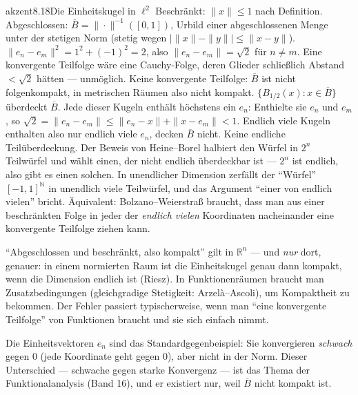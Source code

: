 \begin{loesungkarte}{akzent}{8.18}{Die Einheitskugel in $\ell^{2}$}
Beschränkt: $\|x\|\le1$ nach Definition. Abgeschlossen: $\overline B = \|\cdot\|^{-1}([0, 1])$, Urbild einer abgeschlossenen Menge unter der stetigen Norm (stetig wegen $\bigl|\|x\| - \|y\|\bigr|\le\|x - y\|$).
$\|e_n - e_m\|^{2} = 1^{2} + (-1)^{2} = 2$, also $\|e_n - e_m\| = \sqrt2$ für $n\neq m$. Eine konvergente Teilfolge wäre eine Cauchy-Folge, deren Glieder schließlich Abstand $< \sqrt2$ hätten --- unmöglich. Keine konvergente Teilfolge: $\overline B$ ist nicht folgenkompakt, in metrischen Räumen also nicht kompakt.
$\{B_{1/2}(x)\colon x\in\overline B\}$ überdeckt $\overline B$. Jede dieser Kugeln enthält höchstens ein $e_n$: Enthielte sie $e_n$ und $e_m$, so $\sqrt2 = \|e_n - e_m\|\le\|e_n - x\| + \|x - e_m\| < 1$. Endlich viele Kugeln enthalten also nur endlich viele $e_n$, decken $\overline B$ nicht. Keine endliche Teilüberdeckung. \checkmark
{}
Der Beweis von Heine--Borel halbiert den Würfel in $2^{n}$ Teilwürfel und wählt einen, der nicht endlich überdeckbar ist --- $2^{n}$ ist endlich, also gibt es einen solchen. In unendlicher Dimension zerfällt der \enquote{Würfel} $[-1, 1]^{\mathbb N}$ in unendlich viele Teilwürfel, und das Argument \enquote{einer von endlich vielen} bricht. Äquivalent: Bolzano--Weierstraß braucht, dass man aus einer beschränkten Folge in jeder der \emph{endlich vielen} Koordinaten nacheinander eine konvergente Teilfolge ziehen kann.
\begin{fehler}\kastentext
\enquote{Abgeschlossen und beschränkt, also kompakt} gilt in $\mathbb R^{n}$ --- und \emph{nur} dort, genauer: in einem normierten Raum ist die Einheitskugel genau dann kompakt, wenn die Dimension endlich ist (Riesz). In Funktionenräumen braucht man Zusatzbedingungen (gleichgradige Stetigkeit: Arzelà--Ascoli), um Kompaktheit zu bekommen. Der Fehler passiert typischerweise, wenn man \enquote{eine konvergente Teilfolge} von Funktionen braucht und sie sich einfach nimmt.
\end{fehler}
\begin{mitnehmen}\kastentext
Die Einheitsvektoren $e_n$ sind das Standardgegenbeispiel: Sie konvergieren \emph{schwach} gegen $0$ (jede Koordinate geht gegen $0$), aber nicht in der Norm. Dieser Unterschied --- schwache gegen starke Konvergenz --- ist das Thema der Funktionalanalysis (Band 16), und er existiert nur, weil $\overline B$ nicht kompakt ist.
\end{mitnehmen}
\end{loesungkarte}


